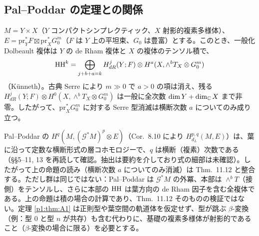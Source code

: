 \subsection{Pal--Poddar の定理との関係}
\begin{prop}[積の場合の整合性]\tP\label{p1:prop:PPprod}
$M=Y\times X$（$Y$ コンパクトシンプレクティック、$X$ 射影的複素多様体）、$E=\mathrm{pr}_Y^*F\boxtimes\mathrm{pr}_X^*G_0^m$（$F$ は $Y$ 上の平坦束、$G_0$ は豊富）とする。このとき、一般化 Dolbeault 複体は $Y$ の de Rham 複体と $X$ の複体のテンソル積で、
\[\mathrm{HH}^k=\bigoplus_{j+b+a=k}H^j_{dR}(Y;F)\otimes H^a(X,\wedge^bT_X\otimes G_0^m)\]
（Künneth）。古典 Serre により $m\gg0$ で $a>0$ の項は消え、残る $H^j_{dR}(Y;F)\otimes H^0(X,\wedge^bT_X\otimes G_0^m)$ は一般に全次数 $\dim Y+\dim_\mathbb C X$ まで非零。したがって、$\mathrm{pr}_X^*G_0^m$ に対する Serre 型消滅は横断次数 $a$ についてのみ成り立つ。
\end{prop}
\begin{rem}[\tQ]
Pal--Poddar の $H^q(M,(\mathcal G^*M)^p\otimes E)$（Cor.\ 8.10 により $H^{p,q}_{d_L}(M,E)$）は、葉に沿って定数な横断形式の層コホモロジーで、$q$ は横断（複素）次数である（\S\S5--11, 13 を再読して確認。抽出は要約を介しており式の細部は未確認）。したがって上の命題の読み（横断次数 $a$ についてのみ消滅）は Thm.\ 11.12 と整合する。ただし群は同じではない：Pal--Poddar は $\mathcal G^*M$ の外冪、本部は $\wedge^bT$（接側）をテンソルし、さらに本部の $\mathrm{HH}$ は葉方向の de Rham 因子を含む全複体である。上の命題は積の場合の計算であり、Thm.\ 11.12 そのものの検証ではない。定理 \ref{p1:thm:A1} は正則型や葉空間の軌道体を仮定せず、型が跳ぶ $\beta$-変換（例：型 0 と型 $n$ が共存）も含む代わりに、基礎の複素多様体が射影的であること（$\beta$-変換の場合に限る）を必要とする。
\end{rem}

